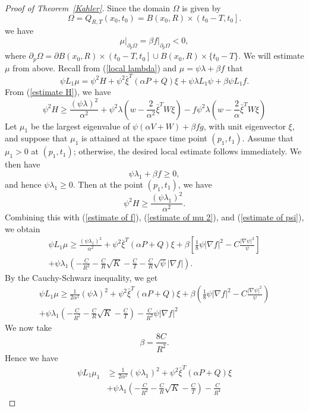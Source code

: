 \documentclass{amsart}
\theoremstyle{definition}
\theoremstyle{remark}
\numberwithin{equation}{section}
\begin{document}
\begin{proof}[Proof of Theorem~\ref{Kahler}]
Since the domain $\Omega$ is given by
\[
\Omega=Q_{R, T}\left(x_0, t_0\right)=B\left(x_0, R\right) \times\left(t_0-T, t_0\right] .
\]
we have
\[
\left.\mu\right|_{\partial_p \Omega}=\left.\beta f\right|_{\partial_p \Omega}<0,
\]
where $\partial_p \Omega=\partial B\left(x_0, R\right)\times\left(t_0-T, t_0\right]\cup B\left(x_0, R\right)\times \{t_0-T\}$.
We will estimate $\mu$ from above. Recall from (\ref{local lambda}) and $\mu=\psi\lambda+\beta f$ that
\begin{equation}\label{estimate of mu 2}
  \psi L_1 \mu=\psi^2 H+\psi^2 \bar{\xi}^T(\alpha P+Q) \xi+\psi \lambda L_1 \psi+\beta \psi L_1 f .
\end{equation}
From (\ref{estimate H}), we have 
\[
\psi^2 H \geq \frac{(\psi \lambda)^2}{\alpha^2}+\psi^2 \lambda\left(w-\frac{2}{\alpha^2} \bar{\xi}^T W \xi\right)-f \psi^2 \lambda\left(w-\frac{2}{\alpha} \bar{\xi}^T W \xi\right)
\]
Let $\mu_1$ be the largest eigenvalue of $\psi(\alpha V+W)+\beta f g$, with unit eigenvector $\xi$, and suppose that $\mu_1$ is attained at the space time point $\left(p_1, t_1\right)$. Assume that $\mu_1>0$ at $(p_{1},t_{1})$; otherwise, the desired local estimate follows immediately. We then have
\[
\psi \lambda_1+\beta f \geq 0,
\]
and hence $\psi \lambda_1 \geq 0$. Then at the point $\left(p_1, t_1\right)$, we have
\[
\psi^2 H \geq \frac{(\psi \lambda_1)^2}{\alpha^2} .
\]
Combining this with (\ref{estimate of f}), (\ref{estimate of mu 2}), and (\ref{estimate of psi}), we obtain
\[
\begin{gathered}
\psi L_1 \mu \geq \frac{(\psi \lambda_1)^2}{\alpha^2}+\psi^2 \bar{\xi}^T(\alpha P+Q) \xi+\beta\left[\frac{1}{8} \psi|\nabla f|^2-C \frac{|\nabla \psi|^2}{\psi}\right] \\
+\psi \lambda_1(-\frac{C}{R^{2}}-\frac{C}{R}\sqrt{K}-\frac{C}{T}-\frac{C}{R}\sqrt{\psi} |\nabla f|).
\end{gathered}
\]
By the Cauchy-Schwarz inequality, we get
\[
\begin{gathered}
\psi L_1 \mu \geq
\frac{1}{2\alpha^2}(\psi \lambda)^2+\psi^2 \bar{\xi}^T(\alpha P+Q) \xi+\beta\left(\frac{1}{8} \psi|\nabla f|^2-C \frac{|\nabla \psi|^2}{\psi}\right) \\
+\psi \lambda_1(-\frac{C}{R^{2}}-\frac{C}{R}\sqrt{K}-\frac{C}{T})
-\frac{C}{R^{2}}\psi |\nabla f|^{2}
\end{gathered}
\]
We now take
\begin{equation}\label{eq:2.30}
  \beta= \frac{8C}{R^{2}}.
\end{equation}
Hence we have 
\[
\begin{aligned}
\psi L_1 \mu_1 &\geq \frac{1}{2\alpha^2}(\psi \lambda_1)^2+\psi^2 \bar{\xi}^T(\alpha P+Q) \xi \\
&+\psi \lambda_1(-\frac{C}{R^{2}}-\frac{C}{R}\sqrt{K}-\frac{C}{T})
-\frac{C}{R^{4}}
\end{aligned}
\]




\end{proof}
\end{document}
